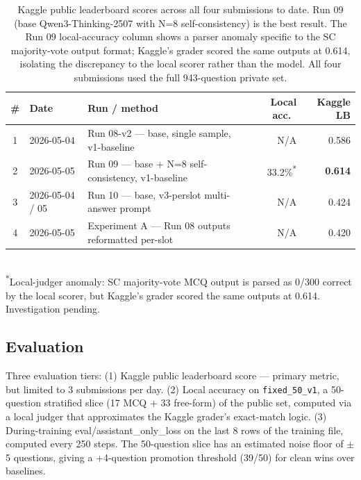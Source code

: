 \documentclass{article}
\begin{document}
\begin{table}[h]
\centering
\small
\caption{Kaggle public leaderboard scores across all four submissions to date. Run 09 (base Qwen3-Thinking-2507 with N=8 self-consistency) is the best result. The Run 09 local-accuracy column shows a parser anomaly specific to the SC majority-vote output format; Kaggle's grader scored the same outputs at 0.614, isolating the discrepancy to the local scorer rather than the model. All four submissions used the full 943-question private set.}
\label{tab:kaggle-submissions}
\begin{tabular}{cllrr}
\toprule
\# & Date & Run / method & Local acc.\ & Kaggle LB \\
\midrule
1 & 2026-05-04        & Run 08-v2 --- base, single sample, v1-baseline       & N/A                       & 0.586 \\
2 & 2026-05-05        & Run 09 --- base + N=8 self-consistency, v1-baseline & 33.2\%\textsuperscript{*} & \textbf{0.614} \\
3 & 2026-05-04 / 05   & Run 10 --- base, v3-perslot multi-answer prompt      & N/A                       & 0.424 \\
4 & 2026-05-05        & Experiment A --- Run 08 outputs reformatted per-slot & N/A                       & 0.420 \\
\bottomrule
\end{tabular}
\\[2pt]
{\footnotesize \textsuperscript{*}Local-judger anomaly: SC majority-vote MCQ output is parsed as 0/300 correct by the local scorer, but Kaggle's grader scored the same outputs at 0.614. Investigation pending.}
\end{table}

\subsection{Evaluation}
\label{sec:evaluation}

Three evaluation tiers: (1) Kaggle public leaderboard score --- primary metric, but limited to 3 submissions per day. (2) Local accuracy on \texttt{fixed\_50\_v1}, a 50-question stratified slice (17 MCQ + 33 free-form) of the public set, computed via a local judger that approximates the Kaggle grader's exact-match logic. (3) During-training eval/assistant\_only\_loss on the last 8 rows of the training file, computed every 250 steps. The 50-question slice has an estimated noise floor of $\pm$5 questions, giving a +4-question promotion threshold (39/50) for clean wins over baselines.
\end{document}
